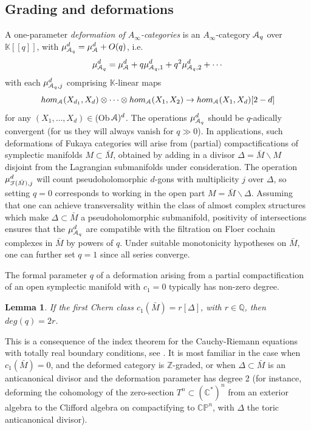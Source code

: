 \documentclass[reqno,10pt]{amsart}
\numberwithin{equation}{section}
\newcommand{\bC}{{\mathbb C}}
\newcommand{\bK}{{\mathbb K}}
\newcommand{\bP}{{\mathbb P}}
\newcommand{\bQ}{{\mathbb Q}}
\newcommand{\bZ}{{\mathbb Z}}
\newcommand{\scrF}{\EuScript{F}}
\newcommand{\scrA}{\EuScript{A}}
\newtheorem{Lemma}[thm]{Lemma}
\theoremstyle{remark}
\begin{document}
\subsection{Grading and deformations\label{Sec:Indices}}
A one-parameter \emph{deformation of $A_{\infty}$-categories} is an $A_{\infty}$-category $\scrA_q$ over $\bK[[q]]$, with $\mu^d_{\scrA_q} = \mu^d_{\scrA} + O(q)$, i.e.
\begin{equation} \label{Eqn:Deformation}
\mu^d_{\scrA_q} = \mu^d_{\scrA} + q\mu^d_{\scrA_q,1} + q^2\mu^d_{\scrA_q,2} + \cdots
\end{equation}
with each $\mu^d_{\scrA_q,j}$ comprising $\bK$-linear maps 
\[
hom_{\scrA}(X_{d_1},X_d) \otimes \cdots \otimes hom_{\scrA}(X_1,X_2) \rightarrow hom_{\scrA}(X_1,X_d)[2-d]
\]
for any $(X_1,\ldots, X_d) \in $(Ob$ \, \scrA)^d$.  The operations $\mu^d_{\scrA_q}$ should be $q$-adically convergent (for us they will always vanish for $q \gg 0$).   In applications, such deformations of Fukaya categories will arise from (partial) compactifications of symplectic manifolds $M\subset \bar{M}$, obtained by adding in a divisor $\Delta = \bar{M} \backslash M$ disjoint from the Lagrangian submanifolds under consideration.  The operation $\mu_{\scrF(\bar{M}),j}^d$ will count pseudoholomorphic $d$-gons with multiplicity $j$ over $\Delta$, so setting $q=0$ corresponds to working in the open part $M=\bar{M}\backslash \Delta$.  Assuming that one can achieve transversality within the class of almost complex structures which make $\Delta \subset \bar{M}$ a pseudoholomorphic submanifold, positivity of intersections ensures that the $\mu^d_{\scrA_q}$ are compatible with the filtration on Floer cochain complexes in $\bar{M}$ by powers of $q$.  Under suitable monotonicity hypotheses on $\bar{M}$, one can further set $q=1$ since all series converge.  

The formal parameter $q$ of a deformation arising from a partial compactification of an open symplectic manifold with $c_1=0$ typically has non-zero degree.

\begin{Lemma} \label{Lem:DeformationDegree}
If the first Chern class $c_1(\bar{M}) = r[\Delta]$, with $r\in \bQ$, then $deg(q) = 2r$. 
\end{Lemma}



This is a consequence of the index theorem for the Cauchy-Riemann equations with totally real boundary conditions, see  \cite[Section 11]{FCPLT}.  It is most familiar in the case when $c_1(\bar{M})=0$, and the deformed category is $\bZ$-graded, or when $\Delta \subset \bar{M}$ is an anticanonical divisor and the deformation parameter has degree 2 (for instance, deforming the cohomology of the zero-section $T^n \subset (\bC^*)^n$ from an exterior algebra to the Clifford algebra on compactifying to $\bC\bP^n$, with $\Delta$ the toric anticanonical divisor).   
\end{document}
